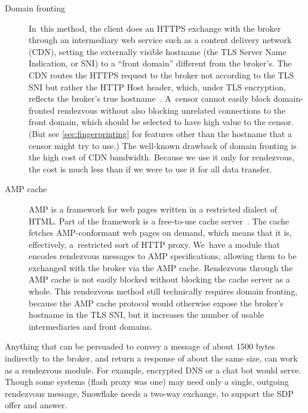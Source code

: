 \documentclass[letterpaper,twocolumn]{article}
\begin{document}
\begin{description}
\item[Domain fronting]
In~this method, the client does an HTTPS exchange with the broker
through an intermediary web service such as a content delivery network (CDN),
setting the externally visible hostname
(the TLS Server Name Indication, or SNI)
to a ``front domain'' different from the broker's.
The CDN routes the HTTPS request to the broker not according to the TLS SNI
but rather the HTTP Host header, which, under TLS encryption,
reflects the broker's true hostname~\cite{Fifield2015a}.
A~censor cannot easily block domain-fronted rendezvous
without also blocking unrelated connections to the front domain,
which should be selected to have high value to the censor.
(But see \autoref{sec:fingerprinting} for features other than
the hostname that a censor might try to use.)
The well-known drawback of domain fronting
is the high cost of CDN bandwidth.
Because we use it only for rendezvous,
the cost is much less than if we were to use it
for all data transfer.

\item[AMP cache]
AMP is a framework for web pages written in a restricted dialect of HTML.
Part of the framework is a free-to-use
cache server~\cite{amp-cache}.
The cache fetches AMP-conformant web pages on demand,
which means that it is, effectively, a~restricted sort of HTTP proxy.
We~have a module that encodes rendezvous messages to AMP specifications,
allowing them to be exchanged with the broker via the AMP cache.
Rendezvous through the AMP cache is not easily blocked
without blocking the cache server as a whole.
This rendezvous method still technically requires domain fronting,
because the AMP cache protocol would otherwise expose the
broker's hostname in the TLS SNI,
but it increases the number of usable intermediaries and front domains.
\end{description}

Anything that can be persuaded to convey a message
of about 1500 bytes indirectly to the broker,
and return a response of about the same size,
can work as a rendezvous module.
For example, encrypted DNS
or a chat bot
would serve.
Though some systems (flash proxy was one)
may need only a single, outgoing rendezvous message,
Snowflake needs a two-way exchange,
to support the SDP offer and answer.
\end{document}
